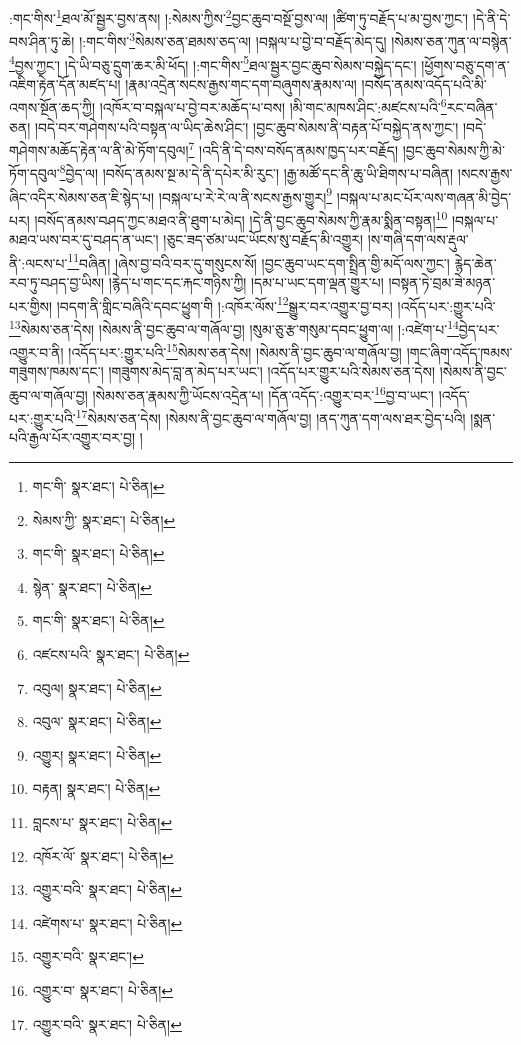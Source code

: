 :གང་གིས་\footnote{གང་གི་  སྣར་ཐང་།  པེ་ཅིན། }ཐལ་མོ་སྦྱར་བྱས་ནས། །:སེམས་ཀྱིས་\footnote{སེམས་ཀྱི་  སྣར་ཐང་།  པེ་ཅིན། }བྱང་ཆུབ་བསྔོ་བྱས་ལ། །ཚིག་ཏུ་བརྗོད་པ་མ་བྱས་ཀྱང་། །དེ་ནི་དེ་བས་ཤིན་ཏུ་ཆེ། །:གང་གིས་\footnote{གང་གི་  སྣར་ཐང་།  པེ་ཅིན། }སེམས་ཅན་ཐམས་ཅད་ལ། །བསྐལ་པ་བྱེ་བ་བརྗོད་མེད་དུ། །སེམས་ཅན་ཀུན་ལ་བསྙེན་\footnote{སྙེན་  སྣར་ཐང་།  པེ་ཅིན། }བྱས་ཀྱང་། །དེ་ཡི་བཅུ་དྲུག་ཆར་མི་ཕོད། །:གང་གིས་\footnote{གང་གི་  སྣར་ཐང་།  པེ་ཅིན། }ཐལ་སྦྱར་བྱང་ཆུབ་སེམས་བསྐྱེད་དང་། །ཕྱོགས་བཅུ་དག་ན་འཇིག་རྟེན་དོན་མཛད་པ། །རྣམ་འདྲེན་སངས་རྒྱས་གང་དག་བཞུགས་རྣམས་ལ། །བསོད་ནམས་འདོད་པའི་མི་འགས་སྔོན་ཆད་ཀྱི། །འཁོར་བ་བསྐལ་པ་བྱེ་བར་མཆོད་པ་བས། །མི་གང་མཁས་ཤིང་:མཛངས་པའི་\footnote{འཛངས་པའི་  སྣར་ཐང་།  པེ་ཅིན། }རང་བཞིན་ཅན། །བདེ་བར་གཤེགས་པའི་བསྟན་ལ་ཡིད་ཆེས་ཤིང་། །བྱང་ཆུབ་སེམས་ནི་བརྟན་པོ་བསྐྱེད་ནས་ཀྱང་། །བདེ་གཤེགས་མཆོད་རྟེན་ལ་ནི་མེ་ཏོག་དབུལ།\footnote{འབུལ།  སྣར་ཐང་།  པེ་ཅིན། } །འདི་ནི་དེ་བས་བསོད་ནམས་ཁྱད་པར་བརྗོད། །བྱང་ཆུབ་སེམས་ཀྱི་མེ་ཏོག་དབུལ་\footnote{འབུལ་  སྣར་ཐང་།  པེ་ཅིན། }བྱེད་ལ། །བསོད་ནམས་སྔ་མ་དེ་ནི་དཔེར་མི་རུང་། །རྒྱ་མཚོ་དང་ནི་ཆུ་ཡི་ཐིགས་པ་བཞིན། །སངས་རྒྱས་ཞིང་འདིར་སེམས་ཅན་ཇི་སྙེད་པ། །བསྐལ་པ་རེ་རེ་ལ་ནི་སངས་རྒྱས་གྱུར།\footnote{འགྱུར།  སྣར་ཐང་།  པེ་ཅིན། } །བསྐལ་པ་མང་པོར་ལས་གཞན་མི་བྱེད་པར། །བསོད་ནམས་བཤད་ཀྱང་མཐའ་ནི་ཐུག་པ་མེད། །དེ་ནི་བྱང་ཆུབ་སེམས་ཀྱི་རྣམ་སྨིན་བསྟན།\footnote{བརྟན།  སྣར་ཐང་།  པེ་ཅིན། } །བསྐལ་པ་མཐའ་ཡས་བར་དུ་བཤད་ན་ཡང་། །ཅུང་ཟད་ཙམ་ཡང་ཡོངས་སུ་བརྗོད་མི་འགྱུར། །ས་གཞི་དག་ལས་རྡུལ་ནི་:ལངས་པ་\footnote{བླངས་པ་  སྣར་ཐང་།  པེ་ཅིན། }བཞིན། །ཞེས་བྱ་བའི་བར་དུ་གསུངས་སོ། །བྱང་ཆུབ་ཡང་དག་སྤྲིན་གྱི་མདོ་ལས་ཀྱང་། རྙེད་ཆེན་རབ་ཏུ་བཤད་བྱ་ཡིས། །རྙེད་པ་གང་དང་རྐང་གཉིས་ཀྱི། །དམ་པ་ཡང་དག་ལྡན་གྱུར་པ། །བསྟན་ཏེ་བྲམ་ཟེ་མཉན་པར་གྱིས། །བདག་ནི་གླིང་བཞིའི་དབང་ཕྱུག་གི །:འཁོར་ལོས་\footnote{འཁོར་ལོ་  སྣར་ཐང་།  པེ་ཅིན། }སྒྱུར་བར་འགྱུར་བྱ་བར། །འདོད་པར་:གྱུར་པའི་\footnote{འགྱུར་བའི་  སྣར་ཐང་།  པེ་ཅིན། }སེམས་ཅན་དེས། །སེམས་ནི་བྱང་ཆུབ་ལ་གཞོལ་བྱ། །སུམ་ཅུ་རྩ་གསུམ་དབང་ཕྱུག་ལ། །:འཛེག་པ་\footnote{འཛེགས་པ་  སྣར་ཐང་།  པེ་ཅིན། }བྱེད་པར་འགྱུར་བ་ནི། །འདོད་པར་:གྱུར་པའི་\footnote{འགྱུར་བའི་  སྣར་ཐང་། }སེམས་ཅན་དེས། །སེམས་ནི་བྱང་ཆུབ་ལ་གཞོལ་བྱ། །གང་ཞིག་འདོད་ཁམས་གཟུགས་ཁམས་དང་། །གཟུགས་མེད་བླ་ན་མེད་པར་ཡང་། །འདོད་པར་གྱུར་པའི་སེམས་ཅན་དེས། །སེམས་ནི་བྱང་ཆུབ་ལ་གཞོལ་བྱ། །སེམས་ཅན་རྣམས་ཀྱི་ཡོངས་འདྲེན་པ། །དོན་འདོད་:འགྱུར་བར་\footnote{འགྱུར་བ་  སྣར་ཐང་།  པེ་ཅིན། }བྱ་བ་ཡང་། །འདོད་པར་:གྱུར་པའི་\footnote{འགྱུར་བའི་  སྣར་ཐང་།  པེ་ཅིན། }སེམས་ཅན་དེས། །སེམས་ནི་བྱང་ཆུབ་ལ་གཞོལ་བྱ། །ནད་ཀུན་དག་ལས་ཐར་བྱེད་པའི། །སྨན་པའི་རྒྱལ་པོར་འགྱུར་བར་བྱ། །

